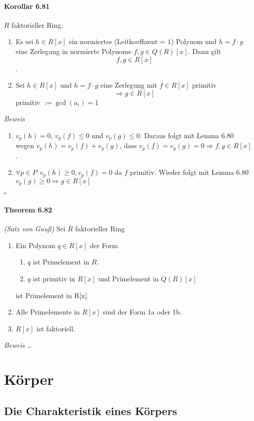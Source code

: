\documentclass{scrartcl}
\begin{document}
\paragraph{Korollar 6.81}
$R$ faktorieller Ring.
\begin{enumerate}
  \item Es sei $h\in R[x]$ ein normiertes (Leitkoeffizent = $1$) Polynom und
    $h=f\cdot g$ eine Zerlegung in normierte Polynome $f,g \in Q(R)[x]$. Dann gilt
    \[
      f,g \in R[x]
    \].
  \item Sei $h \in R[x]$ und $h=f\cdot g$ eine Zerlegung mit $f\in R[x]$
    primitiv
    \[
      \Rightarrow g \in R[x]
    \]
    primitiv $:= \gcd(a_i)=1$ 
\end{enumerate}
\textit{Beweis}
\begin{enumerate}
  \item $v_p(h)=0$, $v_p(f) \leq 0$ und $v_p(g) \leq 0$. Daraus folgt mit Lemma
    6.80 wegen $v_p(h)=v_p(f)+v_p(g)$, dass $v_p(f)=v_p(g)=0 \Rightarrow f,g \in
    R[x]$.
  \item $\forall p\in P~~v_p(h)\geq 0, v_p(f)=0$ da $f$ primitiv. Wieder folgt
    mit Lemma 6.80 $v_p(g)\geq 0 \Rightarrow g\in R[x]$
  \end{enumerate}
  \hfill $\square$
\paragraph{Theorem 6.82} \textit{(Satz von Gauß)}
Sei $R$ faktorieller Ring
\begin{enumerate}
\item Ein Polynom $q\in R[x]$ der Form
  \begin{enumerate}[label=\alph*)]
  \item $q$ ist Primelement in $R$.
  \item $q$ ist primitiv in $R[x]$ und Primelement in $Q(R)[x]$
  \end{enumerate}
  ist Primelement in R[x].
\item Alle Primelemente in $R[x]$ sind der Form 1a oder 1b.
\item $R[x]$ ist faktoriell.
\end{enumerate}
\textit{Beweis}
\dots

\section*{Körper}
\subsection{Die Charakteristik eines Körpers}
\end{document}
